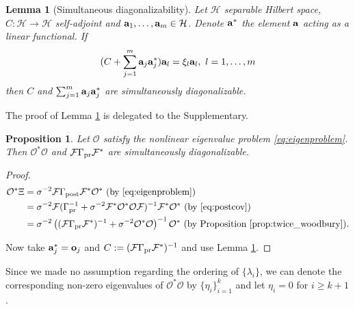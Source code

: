 \documentclass[ba]{imsart}
\newcommand{\hil}{\mathcal{H}}
\newcommand{\obs}{\mathcal{O}}
\newcommand{\fwd}{\mathcal{F}}
\newcommand{\meas}{\mathbf{o}}
\theoremstyle{plain}
\newtheorem{lemma}[theorem]{Lemma}
\newtheorem{proposition}[theorem]{Proposition}
\theoremstyle{definition}
\theoremstyle{remark}
\begin{document}
\begin{lemma}[Simultaneous diagonalizability]\label{lemma:sim_diag}
  Let $\hil$ separable Hilbert space, $C:\hil \to \hil$ self-adjoint
  and $\func_1,\dots,\func_m \in \hil$. Denote $\mathbf{a}^*$ the element
  $\mathbf{a}$ acting as a linear functional. If
  \begin{equation*}
   (C + \sum_{j=1}^m \func_j\func_j^*) \func_l = \xi_l \func_l,\ l = 1,\dots,m
  \end{equation*}
  then $C$ and $\sum_{j=1}^m \mathbf{a}_j \mathbf{a}_j^*$ are simultaneously
  diagonalizable.
\end{lemma}
The proof of Lemma \ref{lemma:sim_diag} is delegated to the
Supplementary.

\begin{proposition}\label{prop:same_ev}
  Let $\obs$ satisfy the nonlinear eigenvalue problem
  \eqref{eq:eigenproblem}. Then $\obs^*\obs$ and $\fwd \prcov \fwd^*$
  are simultaneously diagonalizable.
\end{proposition}
\begin{proof}
  \begin{align}\label{eq:mod_conditions}
    \begin{split}
      \obs^* \Xi &= \sigma^{-2}\fwd \postcov \fwd^* \obs^*  \text{ (by \eqref{eq:eigenproblem})}\\
&= \sigma^{-2} \fwd( \prcov^{-1} + \sigma^{-2}  \fwd^* \obs^* \obs \fwd )^{-1} \fwd^* \obs^*  \text{ (by \eqref{eq:postcov})} \\
&= \sigma^{-2} \left ( (\fwd\prcov\fwd^*)^{-1} + \sigma^{-2}  \obs^* \obs \right )^{-1} \obs^* \text{ (by Proposition \ref{prop:twice_woodbury})}.
    \end{split}
  \end{align}

  Now take $\func_j^{*} = \meas_j$ and $C := (\fwd \prcov
  \fwd^*)^{-1}$ and use Lemma \ref{lemma:sim_diag}.
\end{proof}

Since we made no assumption regarding the ordering of $\{\lambda_i\}$,
we can denote the corresponding non-zero eigenvalues of $\obs^*\obs$
by $\{\eta_i\}_{i=1}^{k}$ and let $\eta_i = 0$ for $i \geq k+1$.
\end{document}
